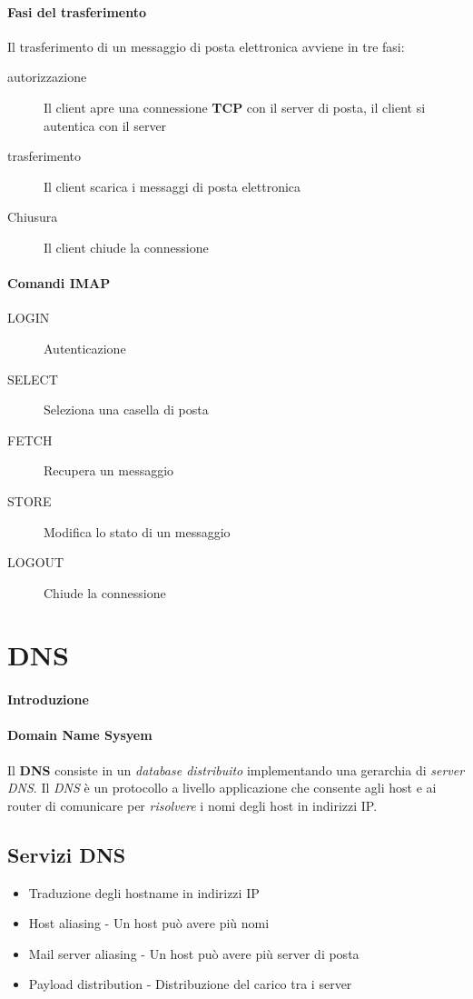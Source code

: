         \paragraph{Fasi del trasferimento} Il trasferimento di un messaggio di posta elettronica avviene in tre fasi:
            \begin{description}
                \item[autorizzazione] Il client apre una connessione \textbf{TCP} con il server di posta, il client si autentica con il server
                \item[trasferimento] Il client scarica i messaggi di posta elettronica
                \item[Chiusura] Il client chiude la connessione
            \end{description}
        \paragraph{Comandi IMAP}
            \begin{description}
                \item[LOGIN] Autenticazione
                \item[SELECT] Seleziona una casella di posta
                \item[FETCH] Recupera un messaggio
                \item[STORE] Modifica lo stato di un messaggio
                \item[LOGOUT] Chiude la connessione
            \end{description}
\section{DNS}
    \paragraph{Introduzione}
        \paragraph{Domain Name Sysyem} Il \textbf{DNS} consiste in un \textit{database distribuito} implementando una gerarchia di \textit{server DNS}. Il \textit{DNS} è un protocollo a livello applicazione che consente agli host e ai router di comunicare per \textit{risolvere} i nomi degli host in indirizzi IP.
    \subsection{Servizi DNS}
        \begin{itemize}
            \item Traduzione degli hostname in indirizzi IP
            \item Host aliasing - Un host può avere più nomi
            \item Mail server aliasing - Un host può avere più server di posta
            \item Payload distribution - Distribuzione del carico tra i server
        \end{itemize}
